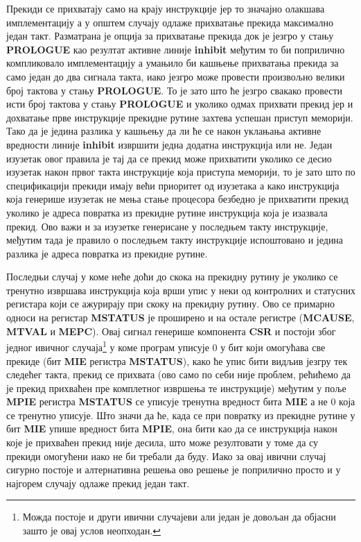 Прекиди се прихватају само на крају инструкције јер то значајно олакшава имплементацију а у општем случају одлаже прихватање прекида максимално један такт.
Разматрана је опција за прихватање прекида док је језгро у стању \textbf{PROLOGUE} као резултат активне линије \textbf{inhibit} међутим то би поприлично компликовало имплементацију а умањило би кашњење прихватања прекида за само један до два сигнала такта, иако језгро може провести произвољно велики број тактова у стању \textbf{PROLOGUE}. То је зато што ће језгро свакако провести исти број тактова у стању \textbf{PROLOGUE} и уколико одмах прихвати прекид јер и дохватање прве инструкције прекидне рутине захтева успешан приступ меморији. Тако да је једина разлика у кашњењу да ли ће се након уклањања активне вредности линије \textbf{inhibit} извршити једна додатна инструкција или не. Један изузетак овог правила је тај да се прекид може прихватити уколико се десио изузетак након првог такта инструкције која приступа меморији, то је зато што по спецификацији прекиди имају већи приоритет од изузетака а како инструкција која генерише изузетак не мења стање процесора безбедно је прихватити прекид уколико је адреса повратка из прекидне рутине инструкција која је изазвала прекид. Ово важи и за изузетке генерисане у последњем такту инструкције, међутим тада је правило о последњем такту инструкције испоштовано и једина разлика је адреса повратка из прекидне рутине.

Последњи случај у коме неће доћи до скока на прекидну рутину је уколико се тренутно извршава инструкција која врши упис у неки од контролних и статусних регистара који се ажурирају при скоку на прекидну рутину. Ово се примарно односи на регистар \textbf{\acrshort{MSTATUS}} је проширено и на остале регистре (\textbf{\acrshort{MCAUSE}}, \textbf{\acrshort{MTVAL}} и \textbf{\acrshort{MEPC}}). Овај сигнал генерише компонента \textbf{CSR} и постоји због једног ивичног случаја\footnote{Можда постоје и други ивични случајеви али један је довољан да објасни зашто је овај услов неопходан.} у коме програм уписује 0 у бит који омогућава све прекиде (бит \textbf{\acrshort{MIE}} регистра \textbf{\acrshort{MSTATUS}}), како ће упис бити видљив језгру тек следећег такта, прекид се прихвата (ово само по себи није проблем, рећићемо да је прекид прихваћен пре комплетног извршења те инструкције) међутим у поље \textbf{\acrshort{MPIE}} регистра \textbf{\acrshort{MSTATUS}} се уписује тренутна вредност бита \textbf{\acrshort{MIE}} а не 0 која се тренутно уписује. Што значи да ће, када се при повратку из прекидне рутине у бит \textbf{\acrshort{MIE}} упише вредност бита \textbf{\acrshort{MPIE}}, она бити као да се инструкција након које је прихваћен прекид није десила, што може резултовати у томе да су прекиди омогућени иако не би требали да буду. Иако за овај ивични случај сигурно постоје и алтернативна решења ово решење је поприлично просто и у најгорем случају одлаже прекид један такт.

